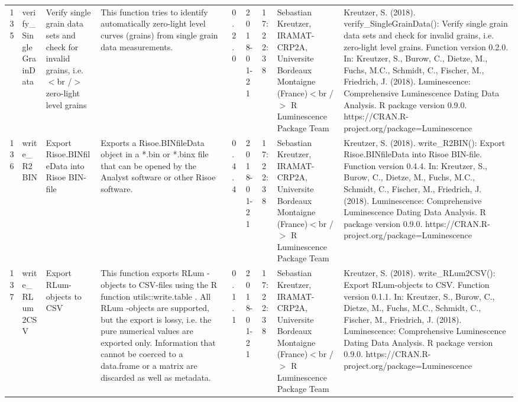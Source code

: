 \begin{table}[ht]
\begin{tabular}{rllllllll}
 \\ 
  135 & verify\_SingleGrainData & Verify single grain data sets and check for invalid grains, i.e.$<$br /$>$ zero-light level grains & This function tries to identify automatically zero-light level curves (grains) from single grain data measurements. & 0.2.0 & 2018-01-21 & 17:22:38
 & Sebastian Kreutzer, IRAMAT-CRP2A, Universite Bordeaux Montaigne (France)$<$br /$>$  R Luminescence Package Team & Kreutzer, S. (2018). verify\_SingleGrainData(): Verify single grain data sets and check for invalid grains, i.e. zero-light level grains. Function version 0.2.0. In: Kreutzer, S., Burow, C., Dietze, M., Fuchs, M.C., Schmidt, C., Fischer, M., Friedrich, J. (2018). Luminescence: Comprehensive Luminescence Dating Data Analysis. R package version 0.9.0. https://CRAN.R-project.org/package=Luminescence
 \\ 
  136 & write\_R2BIN & Export Risoe.BINfileData into Risoe BIN-file & Exports a Risoe.BINfileData object in a *.bin or *.binx file that can be opened by the Analyst software or other Risoe software. & 0.4.4 & 2018-01-21 & 17:22:38
 & Sebastian Kreutzer, IRAMAT-CRP2A, Universite Bordeaux Montaigne (France)$<$br /$>$  R Luminescence Package Team & Kreutzer, S. (2018). write\_R2BIN(): Export Risoe.BINfileData into Risoe BIN-file. Function version 0.4.4. In: Kreutzer, S., Burow, C., Dietze, M., Fuchs, M.C., Schmidt, C., Fischer, M., Friedrich, J. (2018). Luminescence: Comprehensive Luminescence Dating Data Analysis. R package version 0.9.0. https://CRAN.R-project.org/package=Luminescence
 \\ 
  137 & write\_RLum2CSV & Export RLum-objects to CSV & This function exports  RLum -objects to CSV-files using the R function utils::write.table . All  RLum -objects are supported, but the export is lossy, i.e. the pure numerical values are exported only. Information that cannot be coerced to a  data.frame  or a  matrix  are discarded as well as metadata. & 0.1.1 & 2018-01-21 & 17:22:38
 & Sebastian Kreutzer, IRAMAT-CRP2A, Universite Bordeaux Montaigne (France)$<$br /$>$  R Luminescence Package Team & Kreutzer, S. (2018). write\_RLum2CSV(): Export RLum-objects to CSV. Function version 0.1.1. In: Kreutzer, S., Burow, C., Dietze, M., Fuchs, M.C., Schmidt, C., Fischer, M., Friedrich, J. (2018). Luminescence: Comprehensive Luminescence Dating Data Analysis. R package version 0.9.0. https://CRAN.R-project.org/package=Luminescence
 \\ 
   \hline
\end{tabular}
\end{table}

